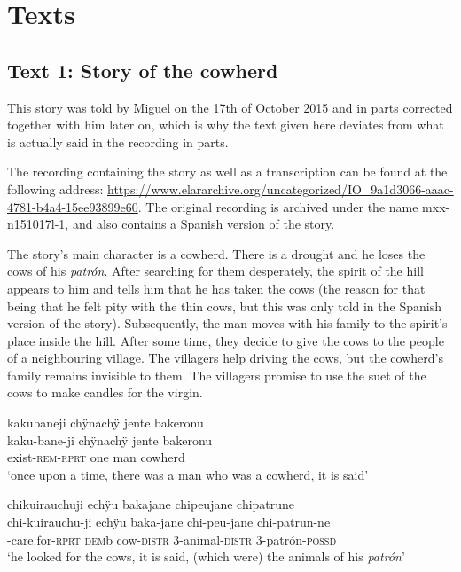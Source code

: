 

\chapter{Texts}

\section{Text 1: Story of the cowherd}\label{sec:CowherdStory}


This story was told by Miguel on the 17th of October 2015 and in parts corrected together with him later on, which is why the text given here deviates from what is actually said in the recording in parts.

The recording containing the story as well as a transcription can be found at the following address:
\url{https://www.elararchive.org/uncategorized/IO_9a1d3066-aaac-4781-b4a4-15ee93899e60}.
The original recording is archived under the name mxx-n151017l-1, and also contains a Spanish version of the story.

The story's main character is a cowherd. There is a drought and he loses the cows of his \textit{patrón}. After searching for them desperately, the spirit of the hill appears to him and tells him that he has taken the cows (the reason for that being that he felt pity with the thin cows, but this was only told in the Spanish version of the story). Subsequently, the man moves with his family to the spirit’s place inside the hill. After some time, they decide to give the cows to the people of a neighbouring village. The villagers help driving the cows, but the cowherd’s family remains invisible to them. The villagers promise to use the suet of the cows to make candles for the virgin.


\ea%
\begingl 
\glpreamble kakubaneji chÿnachÿ jente bakeronu\\
\gla kaku-bane-ji chÿnachÿ jente bakeronu\\ 
\glb exist-\textsc{rem}-\textsc{rprt} one man cowherd\\ 
\glft ‘once upon a time, there was a man who was a cowherd, it is said’\\ 
\endgl
\xe

\ea%
\begingl 
\glpreamble chikuirauchuji echÿu bakajane chipeujane chipatrune\\
\gla chi-kuirauchu-ji echÿu baka-jane chi-peu-jane chi-patrun-ne\\
-care.for-\textsc{rprt} \textsc{dem}b cow-\textsc{distr} 3-animal-\textsc{distr} 3-patrón-\textsc{possd}\\
\glft ‘he looked for the cows, it is said, (which were) the animals of his \textit{patrón}’
\endgl
\xe

